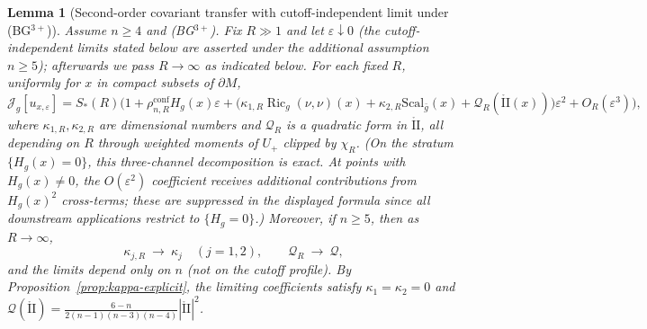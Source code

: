 \documentclass[11pt,reqno,a4paper]{amsart}
\numberwithin{equation}{section}
\theoremstyle{plain}
\newtheorem{lemma}[theorem]{Lemma}
\newcommand{\Scal}{\mathrm{Scal}}
\theoremstyle{remark}
\theoremstyle{plain}
\begin{document}
\begin{lemma}[Second-order covariant transfer with cutoff-independent limit under \textup{(BG$^{3+}$)}]\label{lem:TR2-conf}
Assume $n\ge4$ and \textup{(BG$^{3+}$)}. Fix $R\gg1$ and let $\varepsilon\downarrow0$ (the cutoff-independent limits stated below are asserted under the additional assumption $n\ge5$); afterwards we pass $R\to\infty$ as indicated below. For each fixed $R$, {uniformly for $x$ in compact subsets of $\partial M$},
\begin{equation}\label{eq:E-second-order-R}
\mathcal J_g[u_{x,\varepsilon}]
=S_\ast(R)\Big(1+\rho_{n,R}^{\mathrm{conf}}H_g(x)\varepsilon
+\big(\kappa_{1,R}\operatorname{Ric}_g(\nu,\nu)(x)+\kappa_{2,R}\Scal_{\bar g}(x)+\mathcal Q_R(\mathring{\mathrm{II}}(x))\big)\varepsilon^2
+O_R(\varepsilon^3)\Big),
\end{equation}
where $\kappa_{1,R},\kappa_{2,R}$ are dimensional numbers and $\mathcal Q_R$ is a quadratic form in
$\mathring{\mathrm{II}}$, all depending on $R$ through weighted moments of $U_+$ clipped by $\chi_R$.
(On the stratum $\{H_g(x)=0\}$, this three-channel decomposition is exact.
At points with $H_g(x)\neq0$, the $O(\varepsilon^2)$ coefficient receives additional contributions
from $H_g(x)^2$ cross-terms; these are suppressed in the displayed formula since all
downstream applications restrict to $\{H_g=0\}$.)
Moreover, if $n\ge5$, then as $R\to\infty$,
\begin{equation}\label{eq:kappa-limit}
\kappa_{j,R}\ \longrightarrow\ \kappa_j\quad (j=1,2),\qquad
\mathcal Q_R\ \longrightarrow\ \mathcal Q,
\end{equation}
and the limits depend only on $n$ (not on the cutoff profile).
By Proposition~\ref{prop:kappa-explicit}, the limiting coefficients satisfy
$\kappa_1=\kappa_2=0$ and $\mathcal Q(\mathring{\mathrm{II}})
=\frac{6-n}{2(n-1)(n-3)(n-4)}|\mathring{\mathrm{II}}|^2$.
\end{lemma}
\end{document}

